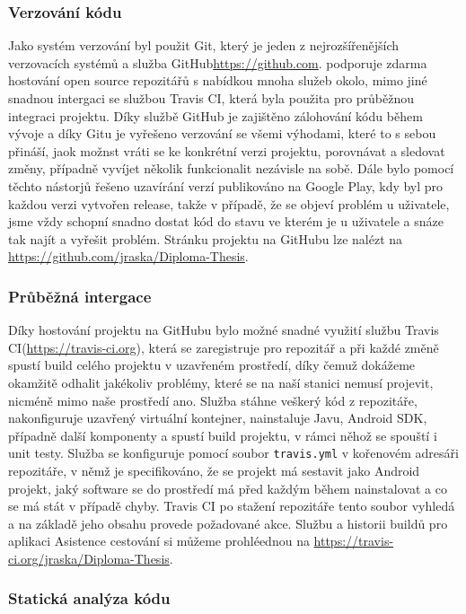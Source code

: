 \documentclass{article}
\begin{document}
 \subsubsection{Verzování kódu}
 Jako systém verzování byl použit Git, který je jeden z nejrozšířenějších verzovacích systémů a služba GitHub\url{https://github.com}.
 podporuje zdarma hostování open source repozitářů s nabídkou mnoha služeb okolo, mimo jiné snadnou intergaci se službou
 Travis CI, která byla použita pro průběžnou integraci projektu. Díky službě GitHub je zajištěno zálohování kódu
 během vývoje a díky Gitu je vyřešeno verzování se všemi výhodami, které to s sebou přináší, jaok možnst vráti se
 ke konkrétní verzi projektu, porovnávat a sledovat změny, případně vyvíjet několik funkcionalit nezávisle na sobě.
 Dále bylo pomocí těchto nástorjů řešeno uzavírání verzí publikováno na Google Play, kdy byl pro každou verzi vytvořen
 release, takže v případě, že se objeví problém u uživatele, jsme vždy schopní snadno dostat kód do stavu
 ve kterém je u uživatele a snáze tak najít a vyřešit problém. Stránku projektu na GitHubu lze nalézt na
 \url{https://github.com/jraska/Diploma-Thesis}.

 \subsubsection{Průběžná intergace}
 Díky hostování projektu na GitHubu bylo možné snadné využití službu Travis CI(\url{https://travis-ci.org}),
 která se zaregistruje pro repozitář
 a při každé změně spustí build celého projektu v uzavřeném prostředí, díky čemuž dokážeme okamžitě
 odhalit jakékoliv problémy, které se na naší stanici nemusí projevit, nicméně mimo naše prostředí ano.
 Služba stáhne veškerý kód z repozitáře, nakonfiguruje uzavřený virtuální kontejner, nainstaluje Javu, Android SDK,
 případně další komponenty a spustí build projektu, v rámci něhož se spouští i unit testy. Služba se konfiguruje pomocí
 soubor \texttt{travis.yml} v kořenovém adresáři repozitáře, v němž je specifikováno, že se projekt má sestavit jako Android projekt,
 jaký software se do prostředí má před každým během nainstalovat a co se má stát v případě chyby. Travis CI po stažení
 repozitáře tento soubor vyhledá a na základě jeho obsahu provede požadované akce.
 Službu a historii buildů pro aplikaci Asistence cestování si můžeme prohléednou na \url{https://travis-ci.org/jraska/Diploma-Thesis}.

 \subsubsection{Statická analýza kódu}
\end{document}
